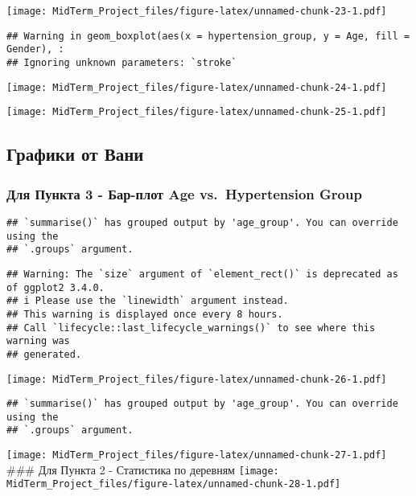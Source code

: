 \documentclass[
]{article}
\begin{document}
\texttt{[image: MidTerm\_Project\_files/figure-latex/unnamed-chunk-23-1.pdf]}

\begin{verbatim}
## Warning in geom_boxplot(aes(x = hypertension_group, y = Age, fill = Gender), :
## Ignoring unknown parameters: `stroke`
\end{verbatim}

\texttt{[image: MidTerm\_Project\_files/figure-latex/unnamed-chunk-24-1.pdf]}

\texttt{[image: MidTerm\_Project\_files/figure-latex/unnamed-chunk-25-1.pdf]}

\subsection{Графики от
Вани}\label{ux433ux440ux430ux444ux438ux43aux438-ux43eux442-ux432ux430ux43dux438}

\subsubsection{Для Пункта 3 - Бар-плот Age vs.~Hypertension
Group}\label{ux434ux43bux44f-ux43fux443ux43dux43aux442ux430-3---ux431ux430ux440-ux43fux43bux43eux442-age-vs.-hypertension-group}

\begin{verbatim}
## `summarise()` has grouped output by 'age_group'. You can override using the
## `.groups` argument.
\end{verbatim}

\begin{verbatim}
## Warning: The `size` argument of `element_rect()` is deprecated as of ggplot2 3.4.0.
## i Please use the `linewidth` argument instead.
## This warning is displayed once every 8 hours.
## Call `lifecycle::last_lifecycle_warnings()` to see where this warning was
## generated.
\end{verbatim}

\texttt{[image: MidTerm\_Project\_files/figure-latex/unnamed-chunk-26-1.pdf]}

\begin{verbatim}
## `summarise()` has grouped output by 'age_group'. You can override using the
## `.groups` argument.
\end{verbatim}

\texttt{[image: MidTerm\_Project\_files/figure-latex/unnamed-chunk-27-1.pdf]}
\#\#\# Для Пункта 2 - Статистика по деревням
\texttt{[image: MidTerm\_Project\_files/figure-latex/unnamed-chunk-28-1.pdf]}
\end{document}
